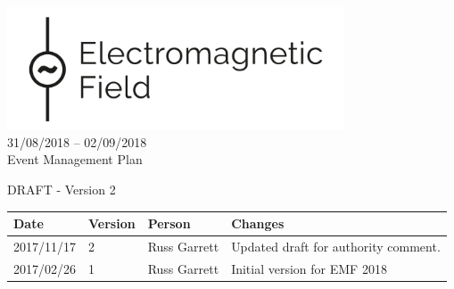 

\newcommand{\st}{\superscript{st} }
\newcommand{\nd}{\superscript{nd} }
\renewcommand{\th}{\superscript{th} }
\newcommand{\rd}{\superscript{rd} }




\begin{titlepage}
\thispagestyle{empty}
\begin{center}
    \includegraphics[width=10cm]{emf-logo.png}\\[24pt]
    {\LARGE 31/08/2018 -- 02/09/2018} \\[48pt]

    {\Large Event Management Plan}

    DRAFT - Version 2

    \vfill

    \begin{tabular}{l | l | l | p{10cm}}
      Date & Version & Person & Changes \\
      \hline
      2017/11/17 & 2 & Russ Garrett & Updated draft for authority comment. \\
      2017/02/26 & 1 & Russ Garrett & Initial version for EMF 2018 \\
    \end{tabular}
\end{center}
\end{titlepage}

\tableofcontents

\newpage



